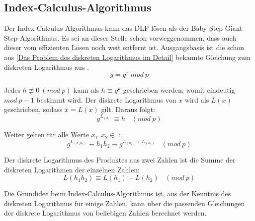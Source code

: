 	\subsection{Index-Calculus-Algorithmus}
		Der Index-Calculus-Algorithmus kann das DLP  lösen als der Baby-Step-Giant-Step-Algorithmus. Es sei an dieser Stelle schon vorweggenommen, dass auch dieser vom effizienten Lösen noch weit entfernt ist. Ausgangsbasis ist die schon aus \ref{Das Problem des diskreten Logarithmus im Detail} bekannte Gleichung  zum diskreten Logarithmus aus \myZPStern.
		\begin{equation}
			y = g^x~mod~p
			\label{Gleichung Diskreten Logarithmus aus ZPStern}
		\end{equation}
		
		Jedes $h \not\equiv 0~(mod~p)$ kann als $h \equiv g^k$ geschrieben werden, womit eindeutig $mod~p - 1$ bestimmt wird. Der diskrete Logarithmus von $x$ wird als $L(x)$ geschrieben, sodass $x = L(x)$ gilt. Daraus folgt:
		\begin{equation}
			g^{L_{(h)}} \equiv h~~~~(mod~p)
			\label{Gleichung Diskreten Logarithmus äquivalent}
		\end{equation}
		
		Weiter gelten für alle Werte $x_1, x_2 \in$ \myZPStern:
		\begin{equation}
			g^{L_{(h_1 h_2)}} \equiv h_1 h_2 \equiv g^{L_{(h_1)} + L_{(h_2)}}~~~~(mod~p)
		\end{equation}
		
		Der diskrete Logarithmus des Produktes aus zwei Zahlen ist die Summe der diskreten Logarithmen der einzelnen Zahlen:
		\begin{equation}
			L(h_1 h_2) \equiv L(h_1) + L(h_2)~~~~(mod~p)
			\label{Gleichung Diskreten Logarithmus additionSubtraktion}
		\end{equation}
		
		Die Grundidee beim Index-Calculus-Algorithmus ist, aus der Kenntnis des diskreten Logarithmus für einige Zahlen, kann über die passenden Gleichungen der diskrete Logarithmus von beliebigen Zahlen berechnet werden.\cite{DLP:ECDLP:Probleme:und:Loesungen} %
		
